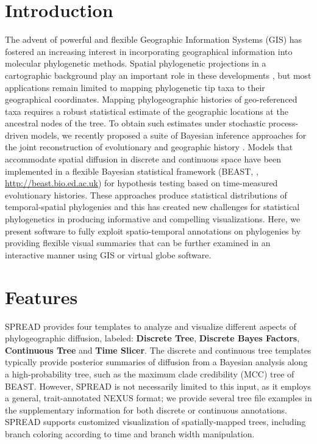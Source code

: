 \section{Introduction}

The advent of powerful and flexible Geographic Information Systems (GIS) has fostered an increasing interest in incorporating geographical information into molecular phylogenetic methods.
Spatial phylogenetic projections in a cartographic background play an important role in these developments \citep{Kidd2006, Parks2009}, but most applications remain limited to mapping phylogenetic tip taxa to their geographical coordinates.
Mapping phylogeographic histories of geo-referenced taxa requires a robust statistical estimate of the geographic locations at the ancestral nodes of the tree. 
To obtain such estimates under stochastic process-driven models, we recently proposed a suite of Bayesian inference approaches for the joint reconstruction of evolutionary and geographic history \citep{Lemey2009,Lemey2010, Bloomquist2010}.
Models that accommodate spatial diffusion in discrete and continuous space have been implemented in a flexible Bayesian statistical framework (BEAST, \cite{Drummond2007}, \url{http://beast.bio.ed.ac.uk}) for hypothesis testing based on time-measured evolutionary histories.
These approaches produce statistical distributions of temporal-spatial phylogenies and this has created new challenges for statistical phylogenetics in producing informative and compelling visualizations.
Here, we present software to fully exploit spatio-temporal annotations on phylogenies by providing flexible visual summaries that can be further examined in an interactive manner using GIS or virtual globe software. 

\section{Features}

SPREAD provides four templates to analyze and visualize different aspects of phylogeographic diffusion, labeled: \textbf{Discrete Tree}, \textbf{Discrete Bayes Factors}, \textbf{Continuous Tree} and \textbf{Time Slicer}.
The discrete and continuous tree templates typically provide posterior summaries of diffusion from a Bayesian analysis along a high-probability tree, such as the maximum clade credibility (MCC) tree of BEAST. 
However, SPREAD is not necessarily limited to this input, as it employs a general, trait-annotated NEXUS format; we provide several tree file examples in the supplementary information for both discrete or continuous annotations. 
SPREAD supports customized visualization of spatially-mapped trees, including branch coloring according to time and branch width manipulation.

